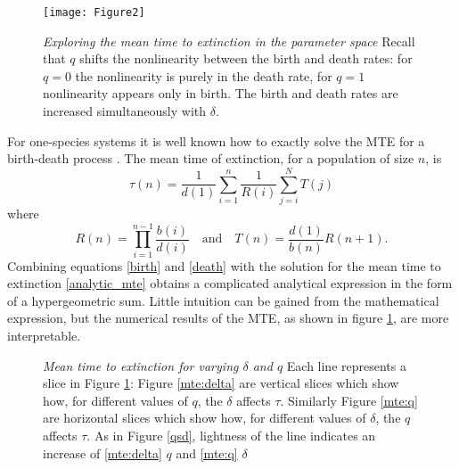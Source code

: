 \begin{figure}[ht!]
	\centering
	\texttt{[image: Figure2]}
	\caption{\emph{Exploring the mean time to extinction in the parameter space} Recall that $q$ shifts the nonlinearity between the birth and death rates: for $q=0$ the nonlinearity is purely in the death rate, for $q=1$ nonlinearity appears only in birth. The birth and death rates are increased simultaneously with $\delta$.} \label{mteCP}
\end{figure}

For one-species systems it is well known how to exactly solve the MTE for a birth-death process \cite{Nisbet1982,paper this R,T comes from}. 
The mean time of extinction, for a population of size $n$, is
\begin{equation}
\tau(n) = \frac{1}{d(1)} \sum_{i=1}^n \frac{1}{R(i)} \sum_{j=i}^N T(j)
\label{analytic_mte}
\end{equation}
where
\begin{equation*}
R(n) = \prod_{i=1}^{n-1} \frac{b(i)}{d(i)} \quad \textrm{and} \quad T(n) = \frac{d(1)}{b(n)}R(n+1).
\end{equation*}
Combining equations \ref{birth} and \ref{death} with the solution for the mean time to extinction \ref{analytic_mte} obtains a complicated analytical expression in the form of a hypergeometric sum. 
Little intuition can be gained from the mathematical expression, but the numerical results of the MTE, as shown in figure \ref{mteCP}, are more interpretable. 

\begin{figure}[ht!]
	\centering
	\hfill
	\caption{\emph{Mean time to extinction for varying $\delta$ and $q$} Each line represents a slice in Figure \ref{mteCP}: Figure \ref{mte:delta} are vertical slices which show how, for different values of $q$, the $\delta$ affects $\tau$. Similarly Figure \ref{mte:q} are horizontal slices which show how, for different values of $\delta$, the $q$ affects $\tau$. As in Figure \ref{qsd}, lightness of the line indicates an increase of \ref{mte:delta} $q$ and \ref{mte:q} $\delta$}
	\label{mte}
\end{figure}

